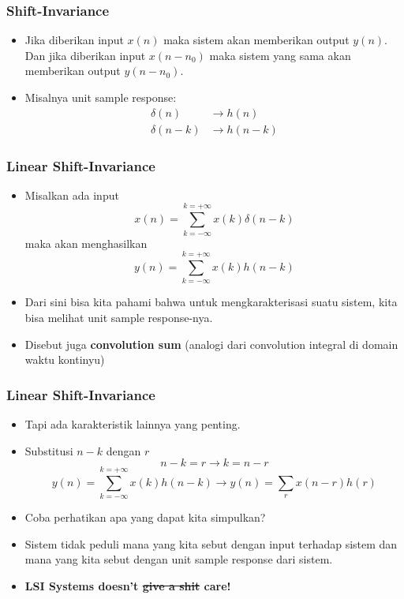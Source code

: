 \documentclass[pdflatex,compress]{beamer}
\begin{document}
\begin{frame}
	\frametitle{Shift-Invariance}
	\begin{itemize}
		\item Jika diberikan input $ x(n) $ maka sistem akan memberikan output $ y(n) $. Dan jika diberikan input $ x(n-n_0) $ maka sistem yang sama akan memberikan output $ y(n-n_0) $.
		\item Misalnya unit sample response:
		\begin{align*}
			\delta(n) &\rightarrow h(n) \\
			\delta(n-k) &\rightarrow h(n-k)
		\end{align*}
	\end{itemize}
\end{frame}

\begin{frame}
	\frametitle{Linear Shift-Invariance}
	\begin{itemize}
		\item Misalkan ada input \[ x(n) = \sum_{k = -\infty}^{k = +\infty} x(k)\delta(n-k) \]
		maka akan menghasilkan \[ y(n) = \sum_{k = -\infty}^{k = +\infty} x(k)h(n-k) \]
		\item Dari sini bisa kita pahami bahwa untuk mengkarakterisasi suatu sistem, kita bisa melihat unit sample response-nya.
		\item Disebut juga \textbf{convolution sum} (analogi dari convolution  integral di domain waktu kontinyu)
	\end{itemize}
\end{frame}

\begin{frame}
	\frametitle{Linear Shift-Invariance}
	\begin{itemize}
		\item<1-> Tapi ada karakteristik lainnya yang penting.
		\item<2-> Substitusi $ n - k $ dengan $ r $
		\[ n-k = r \rightarrow k = n-r\]
		\[ y(n) = \sum_{k = -\infty}^{k = +\infty} x(k)h(n-k) \rightarrow y(n) = \sum_r x(n-r)h(r) \]
		\item<3-> Coba perhatikan apa yang dapat kita simpulkan?
		\item<4-> Sistem tidak peduli mana yang kita sebut dengan input terhadap sistem dan mana yang kita sebut dengan unit sample response dari sistem.
		\item<5-> \textbf{LSI Systems doesn't \st{give a shit} care!}
	\end{itemize}
\end{frame}
\end{document}
